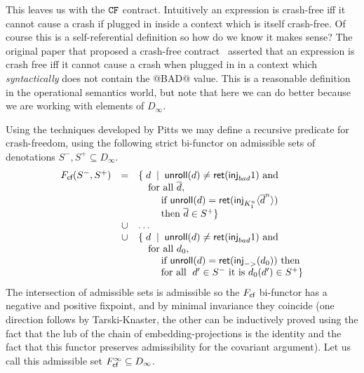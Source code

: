 This leaves us with the ${\tt CF}$ contract. Intuitively an expression is crash-free iff it cannot
cause a crash if plugged in inside a context which is itself crash-free. Of course this is a 
self-referential definition so how do we know it makes sense? The original paper that proposed
a crash-free contract~\cite{xu+:contracts} asserted that an expression is crash free iff it 
cannot cause a crash when plugged in in a context which {\em syntactically} does not contain the
@BAD@ value. This is a reasonable definition in the operational semantics world, but note that
here we can do better because we are working with elements of $D_\infty$. 

Using the techniques developed by Pitts we may define a recursive predicate for crash-freedom,
using the following strict bi-functor on admissible sets of 
denotations $S^{-},S^{+} \subseteq D_\infty$.
{\setlength{\arraycolsep}{2pt}
\[\begin{array}{rcl}
   F_{\textsf{cf}}(S^{-},S^{+}) & = & \{\;d\;\mid\;\mathsf{unroll}(d) \neq \mathsf{ret}(\mathsf{inj}_{bad} 1 ) \mbox{ and } \\ 
                      &    & \quad \mbox{for all } \overline{d}, \\ 
                      &    & \quad\quad\mbox{ if } \mathsf{unroll}(d) = \mathsf{ret}(\mathsf{inj}_{K_1^n}\langle\overline{d}^{n}\rangle) \\ 
                      &    & \quad\quad\mbox{ then } \overline{d} \in S^{+} \} \\ 
                   & \cup & \ldots \\ 
                   & \cup & \{\;d\;\mid\;\mathsf{unroll}(d) \neq \mathsf{ret}(\mathsf{inj}_{bad} 1 ) \mbox{ and } \\ 
                   &      & \quad \mbox{for all } d_0, \\
                   &      & \quad\quad\mbox{ if } \mathsf{unroll}(d) = \mathsf{ret}(\mathsf{inj}_{->}(d_0)) \mbox{ then } \\ 
                   &      & \quad\quad\mbox{ for all }\;d' \in S^{-} \mbox{ it is } d_0(d') \in S^{+} \}  \\
\end{array}\]}
The intersection of admissible sets is admissible so the $F_{\textsf{cf}}$ bi-functor has a negative and positive fixpoint, and by minimal 
invariance they coincide (one direction follows by Tarski-Knaster, the other can be inductively proved using the fact that the 
lub of the chain of embedding-projections is the identity and the fact that this 
functor preserves admissibility for the covariant argument). Let us call this admissible set $F_{\textsf{cf}}^{\infty} \subseteq D_{\infty}$.

